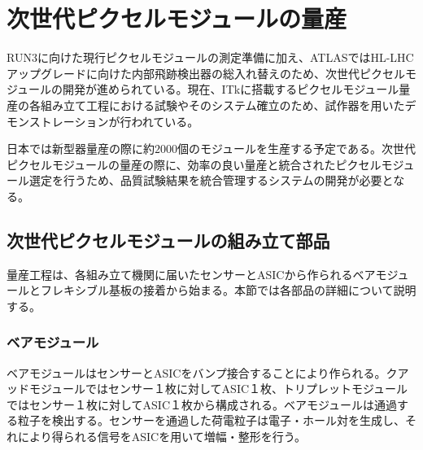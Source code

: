 \chapter{次世代ピクセルモジュールの量産}
\label{sec:singatapixel-devel}
RUN3に向けた現行ピクセルモジュールの測定準備に加え、ATLASではHL-LHCアップグレードに向けた内部飛跡検出器の総入れ替えのため、次世代ピクセルモジュールの開発が進められている。現在、ITkに搭載するピクセルモジュール量産の各組み立て工程における試験やそのシステム確立のため、試作器を用いたデモンストレーションが行われている。

日本では新型器量産の際に約$2000$個のモジュールを生産する予定である。次世代ピクセルモジュールの量産の際に、効率の良い量産と統合されたピクセルモジュール選定を行うため、品質試験結果を統合管理するシステムの開発が必要となる。


\section{次世代ピクセルモジュールの組み立て部品}
\label{sec:component}
量産工程は、各組み立て機関に届いたセンサーとASICから作られるベアモジュールとフレキシブル基板の接着から始まる。本節では各部品の詳細について説明する。


\subsection{ベアモジュール}
\label{sec:bare}

ベアモジュールはセンサーとASICをバンプ接合することにより作られる。クアッドモジュールではセンサー１枚に対してASIC１枚、トリプレットモジュールではセンサー１枚に対してASIC１枚から構成される。ベアモジュールは通過する粒子を検出する。センサーを通過した荷電粒子は電子・ホール対を生成し、それにより得られる信号をASICを用いて増幅・整形を行う。

